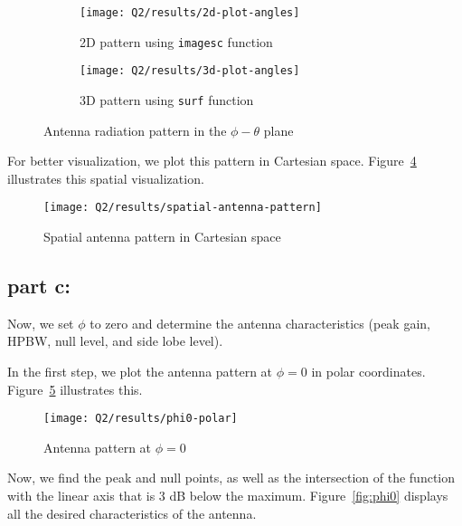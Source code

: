 \documentclass[12pt,onecolumn,a4paper]{article}
\begin{document}
	
	
	
	
	\begin{figure}[h]
		\centering
		\begin{subfigure}{.43\linewidth}
			\centering
			\texttt{[image: Q2/results/2d-plot-angles]}
			\caption{2D pattern using \texttt{imagesc} function}
			\label{fig:2d-plot-angles}
		\end{subfigure}
		\hfill
		\begin{subfigure}{.5\linewidth}
			\centering
			\texttt{[image: Q2/results/3d-plot-angles]}
			\caption{3D pattern using \texttt{surf} function}
			\label{fig:3d-plot-angles}
		\end{subfigure}
		\caption{Antenna radiation pattern in the $\phi-\theta$ plane}
		\label{fig:2d-3d-plot-angles}
	\end{figure}
	
	For better visualization, we plot this pattern in Cartesian space. Figure~\ref{fig:spatial-antenna-pattern} illustrates this spatial visualization.
	
	
	\begin{figure}[h]
		\centering
		\texttt{[image: Q2/results/spatial-antenna-pattern]}
		\caption{Spatial antenna pattern in Cartesian space}
		\label{fig:spatial-antenna-pattern}
	\end{figure}
		
	
	\FloatBarrier
	\subsection{part c:}
	
	Now, we set $\phi$ to zero and determine the antenna characteristics (peak gain, HPBW, null level, and side lobe level).
	
	
	In the first step, we plot the antenna pattern at $\phi=0$ in polar coordinates. Figure~\ref{fig:phi0-polar} illustrates this.
	
	
	\begin{figure}[h]
		\centering
		\texttt{[image: Q2/results/phi0-polar]}
		\caption{Antenna pattern at $\phi = 0$}
		\label{fig:phi0-polar}
	\end{figure}
	
	
	Now, we find the peak and null points, as well as the intersection of the function with the linear axis that is 3 dB below the maximum. Figure~\ref{fig:phi0} displays all the desired characteristics of the antenna.
	
\end{document}
